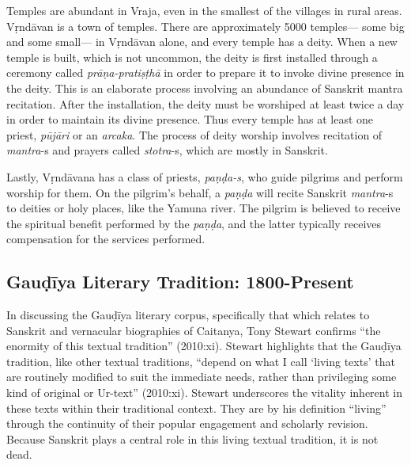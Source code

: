 Temples are abundant in Vraja, even in the smallest of the villages in rural areas. Vṛndāvan is a town of temples. There are approximately 5000 temples— some big and some small— in Vṛndāvan alone, and every temple has a deity. When a new temple is built, which is not uncommon, the deity is first installed through a ceremony called {\sl prāṇa-pratiṣṭhā} in order to prepare it to invoke divine presence in the deity. This is an elaborate process involving an abundance of Sanskrit mantra recitation. After the installation, the deity must be worshiped at least twice a day in order to maintain its divine presence. Thus every temple has at least one priest, {\sl pūjāri} or an {\sl arcaka}. The process of deity worship involves recitation of {\sl mantra}-s and prayers called {\sl stotra}-s, which are mostly in Sanskrit. 

Lastly, Vṛndāvana has a class of priests, {\sl paṇḍa-s}, who guide pilgrims and perform worship for them. On the pilgrim’s behalf, a {\sl paṇḍa} will recite Sanskrit {\sl mantra}-s to deities or holy places, like the Yamuna river. The pilgrim is believed to receive the spiritual benefit performed by the {\sl paṇḍa}, and the latter typically receives compensation for the services performed.
\vskip -50pt

\subsection*{Gauḍīya Literary Tradition: 1800-Present}

In discussing the Gauḍīya literary corpus, specifically that which relates to Sanskrit and vernacular biographies of Caitanya, Tony Stewart confirms “the enormity of this textual tradition” (2010:xi). Stewart highlights that the Gauḍīya tradition, like other textual traditions, “depend on what I call ‘living texts’ that are routinely modified to suit the immediate needs, rather than privileging some kind of original or Ur-text” (2010:xi). Stewart underscores the vitality inherent in these texts within their traditional context. They are by his definition “living” through the continuity of their popular engagement and scholarly revision. Because Sanskrit plays a central role in this living textual tradition, it is not dead.

